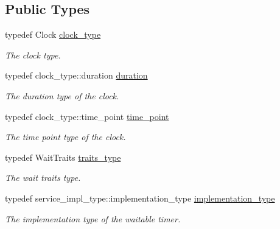 \subsection*{Public Types}
\begin{DoxyCompactItemize}
\item 
typedef Clock \hyperlink{classasio_1_1waitable__timer__service_a39c2c82bad766b47c23abf56738392e7}{clock\+\_\+type}
\begin{DoxyCompactList}\small\item\em The clock type. \end{DoxyCompactList}\item 
typedef clock\+\_\+type\+::duration \hyperlink{classasio_1_1waitable__timer__service_a5ac45e701365614edd95291c94729ce4}{duration}
\begin{DoxyCompactList}\small\item\em The duration type of the clock. \end{DoxyCompactList}\item 
typedef clock\+\_\+type\+::time\+\_\+point \hyperlink{classasio_1_1waitable__timer__service_ae2aa2b85484d98323747703cb9e104df}{time\+\_\+point}
\begin{DoxyCompactList}\small\item\em The time point type of the clock. \end{DoxyCompactList}\item 
typedef Wait\+Traits \hyperlink{classasio_1_1waitable__timer__service_a38e8edeb0413eba7779f2bb97e87aa43}{traits\+\_\+type}
\begin{DoxyCompactList}\small\item\em The wait traits type. \end{DoxyCompactList}\item 
typedef service\+\_\+impl\+\_\+type\+::implementation\+\_\+type \hyperlink{classasio_1_1waitable__timer__service_a397aa07a3c8f707a307b83a9616ed44e}{implementation\+\_\+type}
\begin{DoxyCompactList}\small\item\em The implementation type of the waitable timer. \end{DoxyCompactList}\end{DoxyCompactItemize}
